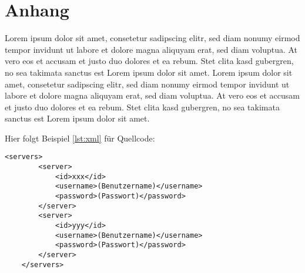 \appendix

\chapter{Anhang}

Lorem ipsum dolor sit amet, consetetur sadipscing elitr, sed diam nonumy eirmod tempor invidunt ut labore et dolore magna aliquyam erat, sed diam voluptua. At vero eos et accusam et justo duo dolores et ea rebum. Stet clita kasd gubergren, no sea takimata sanctus est Lorem ipsum dolor sit amet. Lorem ipsum dolor sit amet, consetetur sadipscing elitr, sed diam nonumy eirmod tempor invidunt ut labore et dolore magna aliquyam erat, sed diam voluptua. At vero eos et accusam et justo duo dolores et ea rebum. Stet clita kasd gubergren, no sea takimata sanctus est Lorem ipsum dolor sit amet.

Hier folgt Beispiel \ref{lst:xml} für Quellcode:

	\begin{lstlisting}[caption=XML-Konfiguration: settings.xml., label=lst:xml]
	<servers>
		<server>
			<id>xxx</id>
			<username>(Benutzername)</username>
			<password>(Passwort)</password>
		</server>
		<server>
			<id>yyy</id>
			<username>(Benutzername)</username>
			<password>(Passwort)</password>
		</server>
	</servers>
	\end{lstlisting}